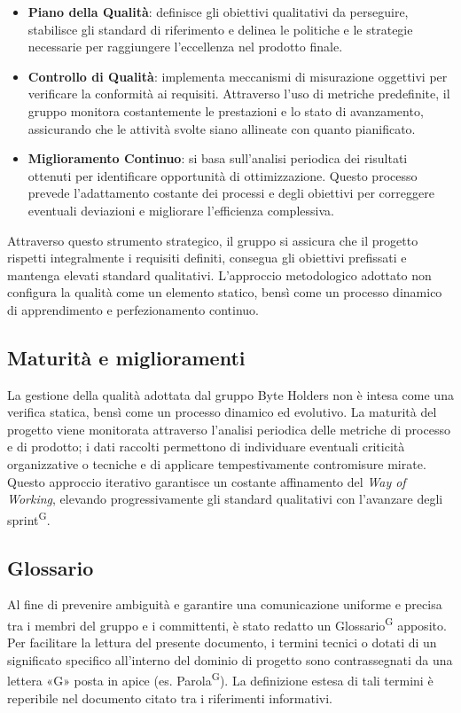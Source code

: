 \documentclass[a4paper, 11pt]{article}
\begin{document}
\begin{itemize}
    \item \textbf{Piano della Qualità}: definisce gli obiettivi qualitativi da perseguire, stabilisce gli standard di riferimento e delinea le politiche e le strategie necessarie per raggiungere l'eccellenza nel prodotto finale.
    \item \textbf{Controllo di Qualità}: implementa meccanismi di misurazione oggettivi per verificare la conformità ai requisiti. Attraverso l'uso di metriche predefinite, il gruppo monitora costantemente le prestazioni e lo stato di avanzamento, assicurando che le attività svolte siano allineate con quanto pianificato.
    \item \textbf{Miglioramento Continuo}: si basa sull'analisi periodica dei risultati ottenuti per identificare opportunità di ottimizzazione. Questo processo prevede l'adattamento costante dei processi e degli obiettivi per correggere eventuali deviazioni e migliorare l'efficienza complessiva.
\end{itemize}

Attraverso questo strumento strategico, il gruppo si assicura che il progetto rispetti integralmente i requisiti definiti, consegua gli obiettivi prefissati e mantenga elevati standard qualitativi.
L'approccio metodologico adottato non configura la qualità come un elemento statico, bensì come un processo dinamico di apprendimento e perfezionamento continuo.

\subsection{Maturità e miglioramenti}
La gestione della qualità adottata dal gruppo Byte Holders non è intesa come una verifica statica, bensì come un processo dinamico ed evolutivo.
La maturità del progetto viene monitorata attraverso l'analisi periodica delle metriche di processo e di prodotto; i dati raccolti permettono di individuare eventuali criticità organizzative o tecniche e di applicare tempestivamente contromisure mirate.
Questo approccio iterativo garantisce un costante affinamento del \textit{Way of Working}, elevando progressivamente gli standard qualitativi con l'avanzare degli sprint\textsuperscript{G}.


\subsection{Glossario}
Al fine di prevenire ambiguità e garantire una comunicazione uniforme e precisa tra i membri del gruppo e i committenti, è stato redatto un Glossario\textsuperscript{G} apposito.
Per facilitare la lettura del presente documento, i termini tecnici o dotati di un significato specifico all'interno del dominio di progetto sono contrassegnati da una lettera «G» posta in apice (es. Parola\textsuperscript{G}).
La definizione estesa di tali termini è reperibile nel documento citato tra i riferimenti informativi.
\end{document}
